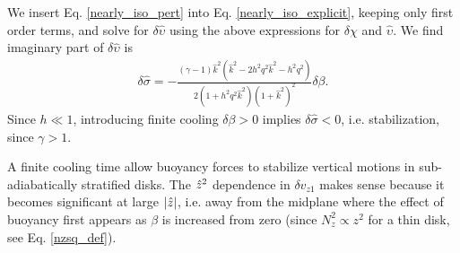 We insert Eq. \ref{nearly_iso_pert} into
Eq. \ref{nearly_iso_explicit}, keeping only first order terms, and
solve for $\delta\hat{\upsilon}$ using the above expressions for $\delta\chi$
and $\hat{\upsilon}$. We find imaginary part of $\delta\hat{\upsilon}$
is 
\begin{align}
  \delta\hat{\sigma} =
  -\frac{\left(\gamma-1\right)\hat{k}^2 \left(\hat{k}^2 -
      2h^2q^2\hat{k}^2 - h^2q^2\right)}{2\left(1+h^2 q^2
      \hat{k}^2\right)\left(1+\hat{k}^2\right)^2}\delta\beta.  
\end{align}
Since $h \ll 1$, introducing finite cooling $\delta\beta>0$
implies $\delta\hat{\sigma} < 0$, i.e. stabilization, since $\gamma>1$. 

A finite cooling time allow buoyancy
forces to stabilize vertical motions in sub-adiabatically stratified
disks. The $\hat{z}^2$ dependence in $\delta v_{z1}$ makes  
sense because it becomes significant at large $|\hat{z}|$, i.e. away from
the midplane where the effect of buoyancy first appears as $\beta$ is
increased from zero (since $N_z^2\propto z^2$ for a thin disk, see
Eq. \ref{nzsq_def}).   

